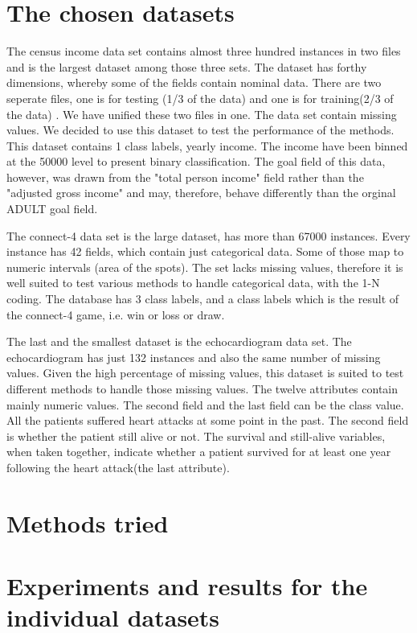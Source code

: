 \documentclass[a4paper]{article}
\begin{document}
\section{The chosen datasets}
The census income data set contains almost three hundred instances in two files and is the largest dataset among those three sets. The dataset has forthy dimensions, whereby some of the fields contain nominal data. There are two seperate files, one is for testing (1/3 of the data) and one is for training(2/3 of the data) . We have unified these two files in one. The data set contain missing values. We decided to use
this dataset to test the performance of the methods. This dataset contains 1 class labels, yearly income. The income have been binned at the 50000 level to present binary classification. The goal field of this data, however, was drawn from the "total person income" field rather than the "adjusted gross income" and may, therefore, behave differently than the orginal ADULT goal field.

The connect-4 data set is the large dataset, has more than 67000 instances. Every instance has 42 fields,
which contain just categorical data. Some of those map to numeric intervals
(area of the spots). The set lacks missing values, therefore it is well suited
to test various methods to handle categorical data, with the 1-N coding. The database has 3 class labels, and a class labels which
is the result of the connect-4 game, i.e. win or loss or draw.

The last and the smallest dataset is the echocardiogram data set. The
echocardiogram has just 132 instances and also the same number of missing values. Given the high percentage of
missing values, this dataset is suited to test different methods to handle those missing values. The twelve attributes contain mainly numeric values. The second field and the last field can be the class value. All the patients suffered heart attacks at some point in the past. The second field is whether the patient still alive or not. The survival and still-alive variables, when taken together, indicate whether a patient survived for at least one year following the heart attack(the last attribute). 

\section{Methods tried}


\section{Experiments and results for the individual datasets}
\end{document}
